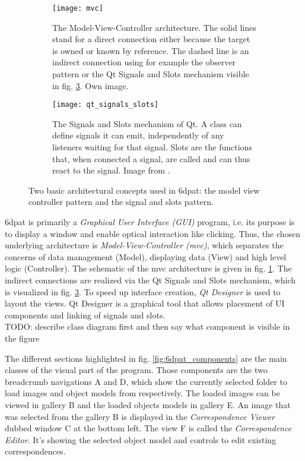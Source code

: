 \begin{figure}[!tbp]
	\centering
	\begin{subfigure}[t]{0.47\textwidth}
		\centering
    	\texttt{[image: mvc]}
    	\caption{The Model-View-Controller architecture. The solid lines stand for a direct connection either because the target is owned or known by reference. The dashed line is an indirect connection using for example the observer pattern or the Qt Signals and Slots mechanism visible in fig. \ref{fig:qt_signals_slots}. Own image.}
    	\label{fig:mvc}
	\end{subfigure}
	\hfill
	\begin{subfigure}[t]{0.47\textwidth}
	\centering
    	\texttt{[image: qt\_signals\_slots]}
    	\caption{The Signals and Slots mechanism of Qt. A class can define signals it can emit, independently of any listeners waiting for that signal. Slots are the functions that, when connected a signal, are called and can thus react to the signal. Image from \cite{qt_signals_and_slots}.}
    	\label{fig:qt_signals_slots}
	\end{subfigure}
	\caption{Two basic architectural concepts used in \gls{6dpat}: the model view controller pattern and the signal and slots pattern.}
\end{figure} 

\gls{6dpat} is primarily a \textit{Graphical User Interface (GUI)} program, i.e. its purpose is to display a window and enable optical interaction like clicking. Thus, the chosen underlying architecture is \textit{Model-View-Controller (\gls{mvc})}, which separates the concerns of data management (Model), displaying data (View) and high level logic (Controller). The schematic of the \gls{mvc} architecture is given in fig. \ref{fig:mvc}. The indirect connections are realized via the Qt Signals and Slots mechanism, which is visualized in fig. \ref{fig:qt_signals_slots}. To speed up interface creation, \textit{Qt Designer} is used to layout the views. Qt Designer is a graphical tool that allows placement of UI components and linking of signals and slots. \\

TODO: describe class diagram first and then say what component is visible in the figure

The different sections highlighted in fig. \ref{fig:6dpat_components} are the main classes of the visual part of the program. Those components are the two breadcrumb navigations A and D, which show the currently selected folder to load images and object models from respectively. The loaded images can be viewed in gallery B and the loaded objects models in gallery E. An image that was selected from the gallery B is displayed in the \textit{Correspondence Viewer} dubbed window C at the bottom left. The view F is called the \textit{Correspondence Editor}. It's showing the selected object model and controls to edit existing correspondences. \\

